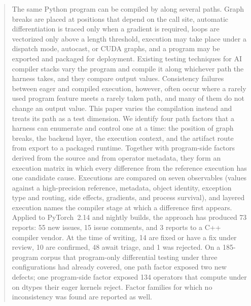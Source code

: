 \begin{abstract}
The same Python program can be compiled by \tcompile along several paths. Graph breaks are placed at positions
that depend on the call site, automatic differentiation is traced only when a gradient is required, loops are
vectorized only above a length threshold, execution may take place under a dispatch mode, autocast, or CUDA
graphs, and a program may be exported and packaged for deployment. Existing testing techniques for AI compiler
stacks vary the program and compile it along whichever path the harness takes, and they compare output
values. Consistency failures between eager and compiled execution, however, often occur where a rarely used
program feature meets a rarely taken path, and many of them do not change an output value.
This paper varies the compilation instead and treats its path as a test dimension. We identify four path factors that a harness can
enumerate and control one at a time: the position of graph breaks, the backend layer, the execution context,
and the artifact route from export to a packaged runtime. Together with program-side factors derived from the
source and from operator metadata, they form an execution matrix in which every difference from the reference
execution has one candidate cause. Executions are compared on seven observables (values against a
high-precision reference, metadata, object identity, exception type and routing, side effects, gradients, and
process survival), and layered execution names the compiler stage at which a difference first appears.
Applied to PyTorch~2.14 and nightly builds, the approach has produced 73 reports: 55 new issues, 15
issue comments, and 3 reports to a C++ compiler vendor. At the time of writing, 14 are fixed or have a fix under
review, 10 are confirmed, 48 await triage, and 1 was rejected. On a 185-program corpus that program-only
differential testing under three configurations had already covered, one path factor exposed two new defects; one
program-side factor exposed 134 operators that compute under \tcompile on dtypes their eager kernels reject.
Factor families for which no inconsistency was found are reported as well.
\end{abstract}
